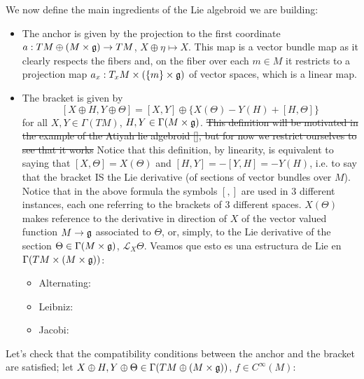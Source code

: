 We now define the main ingredients of the Lie algebroid we are building:
    \begin{itemize}
    \item The anchor is given by the projection to the first coordinate $a: TM \oplus (M \times \mathfrak{g}) \to TM$, $X \oplus \eta \mapsto X$. This map is a vector bundle map as it clearly respects the fibers and, on the fiber over each $m\in M$ it restricts to  a projection map $a_x:T_x M \times (\left\{ m \right\}\times \mathfrak{g})$ of vector spaces, which is a linear map.
    
    \item The bracket is given by 
    \[
        [X \oplus H, Y \oplus \Theta] = [X, Y] \oplus \{X(\Theta) - Y(H) + [H, \Theta]\}
    \]
    for all $X, Y \in \Gamma(TM)$, $H, Y \in \Gamma(M \times \mathfrak{g})$. \sout{This definition will be motivated in the example of the Atiyah lie algebroid \ref{}, but for now we restrict ourselves to see that it works} Notice that this definition, by linearity, is equivalent to saying that $[X, \Theta] = X(\Theta)$ and $[H, Y] = - [Y, H] = -Y(H)$, i.e. to say that the bracket IS the Lie derivative (of sections of vector bundles over $M$). Notice that in the above formula the symbols $[,]$ are used in $3$ different instances, each one referring to the brackets of $3$ different spaces. $X(\Theta)$ makes reference to the derivative in direction of $X$ of the vector valued function $M \to \mathfrak{g}$ associated to $\Theta$, or, simply, to the Lie derivative of the section $\Theta \in \Gamma(M \times \mathfrak{g})$, $\mathcal L_X \Theta$. Veamos que esto es una estructura de Lie en $\Gamma(TM \times (M \times \mathfrak{g}))$:
        \begin{itemize}
        \item Alternating:
        \item Leibniz:
        \item Jacobi:
        \end{itemize}
    \end{itemize}

Let's check that the compatibility conditions between the anchor and the bracket are satisfied; let $X \oplus H, Y \oplus \Theta \in \Gamma(TM \oplus (M \times \mathfrak{g}))$, $f \in C^\infty(M)$:

